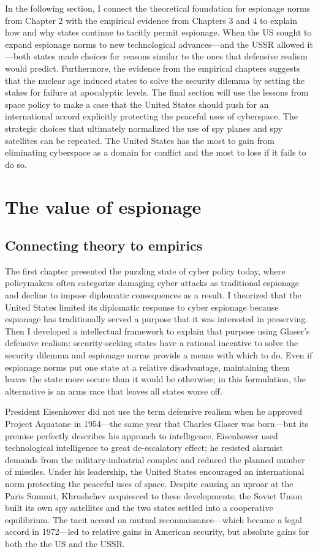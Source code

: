 \documentclass[11pt]{memoir}
\begin{document}
In the following section, I connect the theoretical foundation for espionage norms from Chapter 2 with the empirical evidence from Chapters 3 and 4 to explain how and why states continue to tacitly permit espionage. When the US sought to expand espionage norms to new technological advances---and the USSR allowed it---both states made choices for reasons similar to the ones that defensive realism would predict. Furthermore, the evidence from the empirical chapters suggests that the nuclear age induced states to solve the security dilemma by setting the stakes for failure at apocalyptic levels. The final section will use the lessons from space policy to make a case that the United States should push for an international accord explicitly protecting the peaceful uses of cyberspace. The strategic choices that ultimately normalized the use of spy planes and spy satellites can be repeated. The United States has the most to gain from eliminating cyberspace as a domain for conflict and the most to lose if it fails to do so.

\section{The value of espionage}
\subsection{Connecting theory to empirics}
The first chapter presented the puzzling state of cyber policy today, where policymakers often categorize damaging cyber attacks as traditional espionage and decline to impose diplomatic consequences as a result. I theorized that the United States limited its diplomatic response to cyber espionage because espionage has traditionally served a purpose that it was interested in preserving. Then I developed a intellectual framework to explain that purpose using Glaser's defensive realism: security-seeking states have a rational incentive to solve the security dilemma and espionage norms provide a means with which to do. Even if espionage norms put one state at a relative disadvantage, maintaining them leaves the state more secure than it would be otherwise; in this formulation, the alternative is an arms race that leaves all states worse off.

President Eisenhower did not use the term defensive realism when he approved Project Aquatone in 1954---the same year that Charles Glaser was born---but its premise perfectly describes his approach to intelligence. Eisenhower used technological intelligence to great de-escalatory effect; he resisted alarmist demands from the military-industrial complex and reduced the planned number of missiles. Under his leadership, the United States encouraged an international norm protecting the peaceful uses of space. Despite causing an uproar at the Paris Summit, Khrushchev acquiesced to these developments; the Soviet Union built its own spy satellites and the two states settled into a cooperative equilibrium. The tacit accord on mutual reconnaissance---which became a legal accord in 1972---led to relative gains in American security, but absolute gains for both the the US and the USSR.
\end{document}
